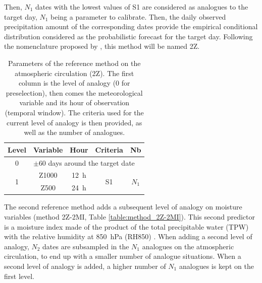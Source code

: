 \documentclass[hess]{copernicus}
\begin{document}
Then, $N_{1}$ dates with the lowest values of S1 are considered as analogues to the target day, $N_{1}$ being a parameter to calibrate. Then, the daily observed precipitation amount of the corresponding dates provide the empirical conditional distribution considered as the probabilistic forecast for the target day. Following the nomenclature proposed by \citet{Horton2016}, this method will be named 2Z.


\begin{table}[htb]
	\caption{Parameters of the reference method on the atmospheric circulation (2Z). The first column is the level of analogy (0 for preselection), then comes the meteorological variable and its hour of observation (temporal window). The criteria used for the current level of analogy is then provided, as well as the number of analogues.}
	\footnotesize
	\begin{center}
		\begin{tabular}{ccccc}
			\hline
			Level & Variable & Hour & Criteria & Nb \\ 
			\hline 
			0 & \multicolumn{4}{l}{$\pm 60$ days around the target date} \\
			\hline 
			\multirow{2}{*}{1} & Z1000 & 12~h & \multirow{2}{*}{S1} & \multirow{2}{*}{$N_{1}$} \\
			& Z500 & 24~h & & \\ 
			\hline 
		\end{tabular} 
	\end{center}
	\label{table:method_2Z}
\end{table}

The second reference method adds a subsequent level of analogy on moisture variables (method 2Z-2MI, Table \ref{table:method_2Z-2MI}). This second predictor is a moisture index made of the product of the total precipitable water (TPW) with the relative humidity at 850~hPa (RH850) \citep{Bontron2004}. When adding a second level of analogy, $N_{2}$ dates are subsampled in the $N_{1}$ analogues on the atmospheric circulation, to end up with a smaller number of analogue situations. When a second level of analogy is added, a higher number of $N_{1}$ analogues is kept on the first level.
\end{document}

